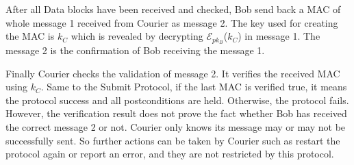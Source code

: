 After all Data blocks have been received and checked, Bob send back a MAC of whole message 1 received from Courier as message 2. The key used for creating the MAC is $ k_C $ which is revealed by decrypting $\mathcal{E}_{pk_B}$($k_C$) in message 1. The message 2 is the confirmation of Bob receiving the message 1.

Finally Courier checks the validation of message 2. It verifies the received MAC using $ k_C $. Same to the Submit Protocol, if the last MAC is verified true, it means the protocol success and all postconditions are held. Otherwise, the protocol fails. However, the verification result does not prove the fact whether Bob has received the correct message 2 or not. Courier only knows its message may or may not be successfully sent. So further actions can be taken by Courier such as restart the protocol again or report an error, and they are not restricted by this protocol.
